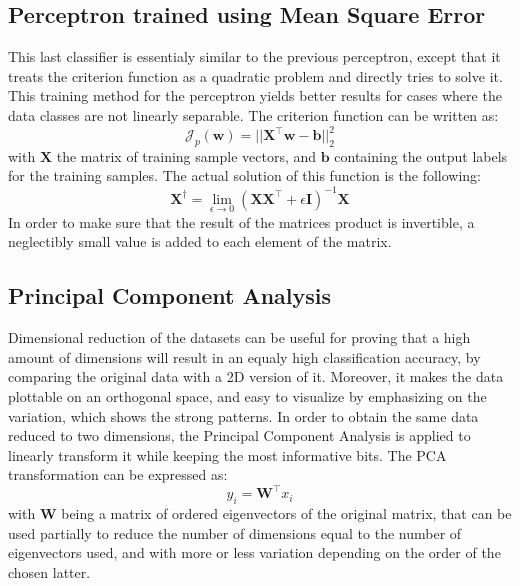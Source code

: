 \subsection{Perceptron trained using Mean Square Error}
This last classifier is essentialy similar to the previous perceptron, except that it treats the criterion function as a quadratic problem and directly tries to solve it. This training method for the perceptron yields better results for cases where the data classes are not linearly separable. The criterion function can be written as:
\begin{equation}
  \mathcal{J}_p(\mathbf{w}) = ||\mathbf{X}^\top\mathbf{w}-\mathbf{b}||_2 ^2
\end{equation}
with $\mathbf{X}$ the matrix of training sample vectors, and $\mathbf{b}$ containing the output labels for the training samples. The actual solution of this function is the following:
\begin{equation}
  \mathbf{X}^\dagger = \lim_{\epsilon \to 0}(\mathbf{X}\mathbf{X}^\top + \epsilon\mathbf{I})^{-1}\mathbf{X}
\end{equation}
In order to make sure that the result of the matrices product is invertible, a neglectibly small value is added to each element of the matrix.

\subsection{Principal Component Analysis}
Dimensional reduction of the datasets can be useful for proving that a high amount of dimensions will result in an equaly high classification accuracy, by comparing the original data with a 2D version of it. Moreover, it makes the data plottable on an orthogonal space, and easy to visualize by emphasizing on the variation, which shows the strong patterns. In order to obtain the same data reduced to two dimensions, the Principal Component Analysis is applied to linearly transform it while keeping the most informative bits. The PCA transformation can be expressed as:
\begin{equation}
  y_i = \mathbf{W}^\top x_i
\end{equation}
with $\mathbf{W}$ being a matrix of ordered eigenvectors of the original matrix, that can be used partially to reduce the number of dimensions equal to the number of eigenvectors used, and with more or less variation depending on the order of the chosen latter.



